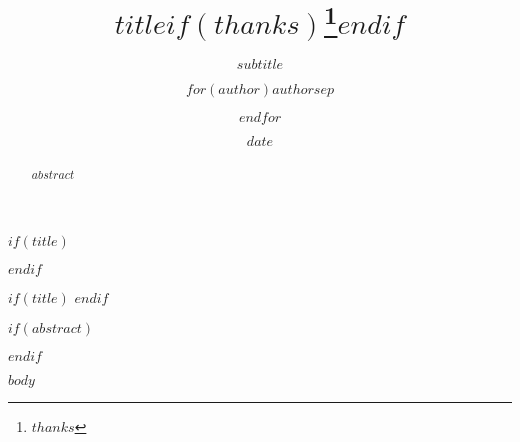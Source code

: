 \documentclass[9pt]{extbook}
\title{$title$$if(thanks)$\thanks{$thanks$}$endif$}
\subtitle{$subtitle$}
\author{$for(author)$$author$$sep$ \and $endfor$}
\date{$date$}
\begin{document}
\frontmatter

$if(title)$
\begin{titlepage}
\maketitle
\end{titlepage}
$endif$

\pagestyle{fancy}
\fancyhf{}
$if(title)$
$endif$
\fancyfoot[C]{\thepage}


\begin{multicols*}{2}
\renewcommand*\contentsname{Table of Contents}
\tableofcontents

\mainmatter

$if(abstract)$
\begin{abstract}
$abstract$
\end{abstract}
$endif$

$body$


\end{multicols*}
\end{document}
